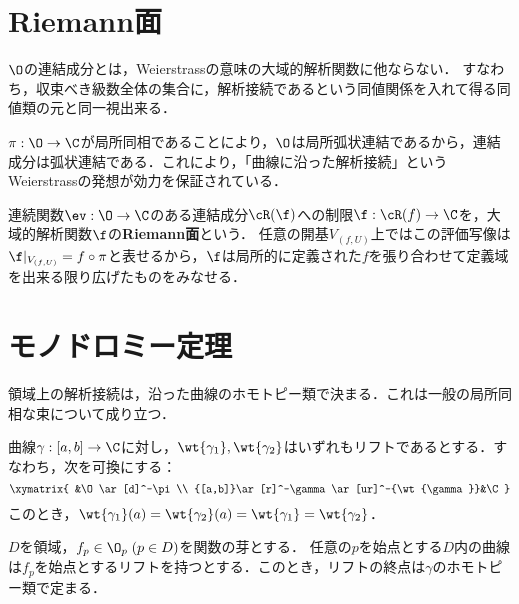 \documentclass[uplatex, dvipdfmx]{jsreport}
\begin{document}
\section{Riemann面}

\begin{theorem}
    $\O$の連結成分とは，Weierstrassの意味の大域的解析関数に他ならない．
    すなわち，収束べき級数全体の集合に，解析接続であるという同値関係を入れて得る同値類の元と同一視出来る．
\end{theorem}
\begin{remarks}
    $\pi:\O\to\C$が局所同相であることにより，$\O$は局所弧状連結であるから，連結成分は弧状連結である．これにより，「曲線に沿った解析接続」というWeierstrassの発想が効力を保証されている．
\end{remarks}

\begin{definition}
    連続関数$\ev:\O\to\C$のある連結成分$\cR(\f)$への制限$\f:\cR(f)\to\C$を，大域的解析関数$\f$の\textbf{Riemann面}という．
    任意の開基$V_(f,U)$上ではこの評価写像は$\f|_{V_{(f,U)}}=f\circ\pi$と表せるから，$\f$は局所的に定義された$f$を張り合わせて定義域を出来る限り広げたものをみなせる．
\end{definition}

\section{モノドロミー定理}

\begin{tcolorbox}[colframe=ForestGreen, colback=ForestGreen!10!white,breakable,colbacktitle=ForestGreen!40!white,coltitle=black,fonttitle=\bfseries\sffamily,
title=]
    領域上の解析接続は，沿った曲線のホモトピー類で決まる．これは一般の局所同相な束について成り立つ．
\end{tcolorbox}

\begin{theorem}[リフトは存在して始点が一致するならば一意的である]
    曲線$\gamma:[a,b]\to\C$に対し，$\wt{\gamma_1},\wt{\gamma_2}$はいずれもリフトであるとする．すなわち，次を可換にする：
    \[\xymatrix{
        &\O\ar[d]^-\pi\\
        {[a,b]}\ar[r]^-\gamma\ar[ur]^-{\wt{\gamma}}&\C
    }\]
    このとき，$\wt{\gamma_1}(a)=\wt{\gamma_2}(a)=\wt{\gamma_1}=\wt{\gamma_2}$．
\end{theorem}

\begin{theorem}[モノドロミー定理]
    $D$を領域，$f_p\in\O_p\;(p\in D)$を関数の芽とする．
    任意の$p$を始点とする$D$内の曲線は$f_p$を始点とするリフトを持つとする．このとき，リフトの終点は$\gamma$のホモトピー類で定まる．
\end{theorem}
\end{document}
